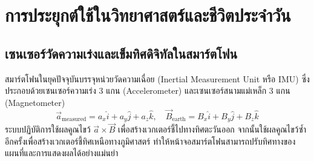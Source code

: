 \section{การประยุกต์ใช้ในวิทยาศาสตร์และชีวิตประจำวัน}
\subsection{เซนเซอร์วัดความเร่งและเข็มทิศดิจิทัลในสมาร์ตโฟน}
สมาร์ตโฟนในยุคปัจจุบันบรรจุหน่วยวัดความเฉื่อย (Inertial Measurement Unit หรือ IMU) ซึ่งประกอบด้วยเซนเซอร์ความเร่ง 3 แกน (Accelerometer) และเซนเซอร์สนามแม่เหล็ก 3 แกน (Magnetometer)
\begin{equation}
\vec{a}_{\text{measured}} = a_x \hat{i} + a_y \hat{j} + a_z \hat{k}, \quad \vec{B}_{\text{earth}} = B_x \hat{i} + B_y \hat{j} + B_z \hat{k}
\end{equation}
ระบบปฏิบัติการใช้ผลคูณไขว้ $\vec{a} \times \vec{B}$ เพื่อสร้างเวกเตอร์ชี้ไปทางทิศตะวันออก จากนั้นใช้ผลคูณไขว้ซ้ำอีกครั้งเพื่อสร้างเวกเตอร์ชี้ทิศเหนือทางภูมิศาสตร์ ทำให้หน้าจอสมาร์ตโฟนสามารถปรับทิศทางของแผนที่และการแสดงผลได้อย่างแม่นยำ

